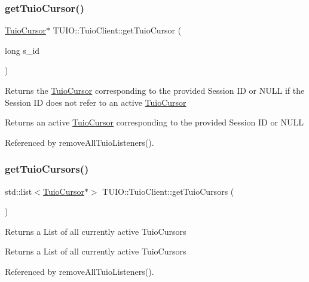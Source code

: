\subsubsection{\texorpdfstring{get\+Tuio\+Cursor()}{getTuioCursor()}}
{\footnotesize\ttfamily \hyperlink{class_t_u_i_o_1_1_tuio_cursor}{Tuio\+Cursor}$\ast$ T\+U\+I\+O\+::\+Tuio\+Client\+::get\+Tuio\+Cursor (\begin{DoxyParamCaption}\item[{long}]{s\+\_\+id }\end{DoxyParamCaption})}

Returns the \hyperlink{class_t_u_i_o_1_1_tuio_cursor}{Tuio\+Cursor} corresponding to the provided Session ID or N\+U\+LL if the Session ID does not refer to an active \hyperlink{class_t_u_i_o_1_1_tuio_cursor}{Tuio\+Cursor}

\begin{DoxyReturn}{Returns}
an active \hyperlink{class_t_u_i_o_1_1_tuio_cursor}{Tuio\+Cursor} corresponding to the provided Session ID or N\+U\+LL 
\end{DoxyReturn}


Referenced by remove\+All\+Tuio\+Listeners().

\mbox{\label{class_t_u_i_o_1_1_tuio_client_a8df501baf8e635b931255a17873e590a}} 
\subsubsection{\texorpdfstring{get\+Tuio\+Cursors()}{getTuioCursors()}}
{\footnotesize\ttfamily std\+::list$<$\hyperlink{class_t_u_i_o_1_1_tuio_cursor}{Tuio\+Cursor}$\ast$$>$ T\+U\+I\+O\+::\+Tuio\+Client\+::get\+Tuio\+Cursors (\begin{DoxyParamCaption}{ }\end{DoxyParamCaption})}

Returns a List of all currently active Tuio\+Cursors

\begin{DoxyReturn}{Returns}
a List of all currently active Tuio\+Cursors 
\end{DoxyReturn}


Referenced by remove\+All\+Tuio\+Listeners().

\mbox{\label{class_t_u_i_o_1_1_tuio_client_a11e2341d753f2acfa0c44fe57f63c92c}} 
